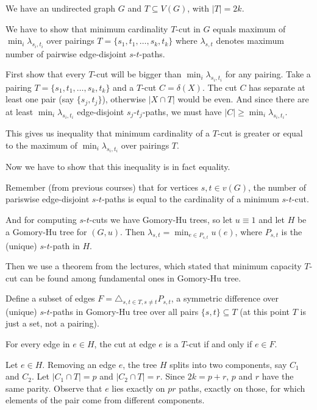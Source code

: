 \newcommand{\sheet}{6}




\maketitle

\begin{exercise}{2}
    We have an undirected graph $G$ and $T \subseteq V(G)$, with $|T| = 2k$.

    We have to show that minimum cardinality $T$-cut in $G$ equals maximum of
    $\min_i \lambda_{s_i, t_i}$ over pairings $T = \{s_1, t_1, \dots, s_k,
    t_k\}$ where $\lambda_{s, t}$ denotes maximum number of pairwise
    edge-disjoint $s$-$t$-paths.

    First show that every $T$-cut will be bigger than $\min_i \lambda_{s_i,
    t_i}$ for any pairing. Take a pairing $T = \{s_1, t_1, \dots, s_k, t_k\}$
    and a $T$-cut $C = \delta(X)$. The cut $C$ has separate at least one pair
    (say $\{s_j, t_j\}$), otherwise $|X \cap T|$ would be even. And since there
    are at least $\min_i \lambda_{s_i, t_i}$ edge-disjoint $s_j$-$t_j$-paths, we
    must have $|C| \geq \min_i \lambda_{s_i, t_i}$.

    This gives us inequality that minimum cardinality of a $T$-cut is greater or
    equal to the maximum of $\min_i \lambda_{s_i, t_i}$ over pairings $T$.

    Now we have to show that this inequality is in fact equality.

    Remember (from previous courses) that for vertices $s, t \in v(G)$,
    the number of pariswise edge-disjoint $s$-$t$-paths is equal to the
    cardinality of a minimum $s$-$t$-cut.
    
    And for computing $s$-$t$-cuts we have Gomory-Hu trees, so let $u \equiv 1$
    and let $H$ be a Gomory-Hu tree for $(G, u)$. Then $\lambda_{s, t} = \min_{e
    \in P_{s, t}} u(e)$, where $P_{s, t}$ is the (unique) $s$-$t$-path in $H$.

    Then we use a theorem from the lectures, which stated that minimum capacity
    $T$-cut can be found among fundamental ones in Gomory-Hu tree.

    Define a subset of edges $F = \triangle_{s, t \in T, s\not=t} P_{s, t}$, a symmetric
    difference over (unique) $s$-$t$-paths in Gomory-Hu tree over all pairs
    $\{s, t\} \subseteq T$ (at this point $T$ is just a set, not a pairing).

    \begin{claim}
        For every edge in $e \in H$, the cut at edge $e$ is a $T$-cut if and
        only if $e \in F$.
    \end{claim}
    \begin{proof_claim}
        Let $e \in H$.
        Removing an edge $e$, the tree $H$ splits into two components, say $C_1$
        and $C_2$. Let $|C_1 \cap T| = p$ and $|C_2 \cap T| = r$. Since $2k =
        p + r$, $p$ and $r$ have the same parity. Observe that $e$ lies exactly
        on $pr$ paths, exactly on those, for which elements of the pair come
        from different components.


\end{proof_claim}
\end{exercise}
